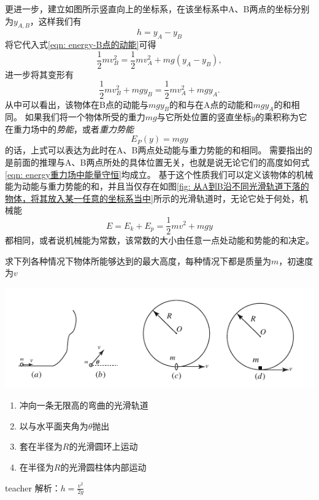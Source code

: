 更进一步，建立如图所示竖直向上的坐标系，在该坐标系中A、B两点的坐标分别为$y_{A,B}$，这样我们有	
\begin{equation}
h = y_A-y_B
\end{equation}
将它代入式\ref{eqn: energy-B点的动能}可得
\begin{equation}
\frac{1}{2}mv_B^2 = \frac{1}{2}mv_A^2 + mg(y_A-y_B),
\end{equation}
进一步将其变形有
\begin{equation}\label{eqn: energy重力场中能量守恒}
\frac{1}{2}mv_B^2 + mgy_B= \frac{1}{2}mv_A^2 + mgy_A.
\end{equation}
从中可以看出，该物体在B点的动能与$mgy_B$的和与在A点的动能和$mgy_A$的和相同。
如果我们将一个物体所受的重力$mg$与它所处位置的竖直坐标$y$的乘积称为它在重力场中的\emph{势能}，或者\emph{重力势能}
\begin{equation}\label{eqn: energy重力势能}
E_P(y) = mgy
\end{equation}
的话，上式可以表达为此时在A、B两点处动能与重力势能的和相同。
需要指出的是前面的推理与A、B两点所处的具体位置无关，也就是说无论它们的高度如何式\ref{eqn: energy重力场中能量守恒}均成立。
基于这个性质我们可以定义该物体的机械能为动能与重力势能的和，并且当仅存在如图\ref{fig: 从A到B沿不同光滑轨道下落的物体，将其放入某一任意的坐标系当中}所示的光滑轨道时，无论它处于何处，机械能
\begin{equation}
E = E_k+E_p = \frac{1}{2}mv^2+mgy
\end{equation}
都相同，或者说机械能为常数，该常数的大小由任意一点处动能和势能的和决定。

\begin{example}
求下列各种情况下物体所能够达到的最大高度，每种情况下都是质量为$m$，初速度为$v$
\begin{center}
\includegraphics{images/energy-5.pdf}
\end{center}
\begin{enumerate}
\item 冲向一条无限高的弯曲的光滑轨道
\item 以与水平面夹角为$\theta$抛出
\item 套在半径为$R$的光滑圆环上运动
\item 在半径为$R$的光滑圆柱体内部运动
\end{enumerate}
\begin{taggedblock}{teacher}
\noindent
解析：$h=\frac{v^2}{2g}$
\end{taggedblock}
\end{example}

